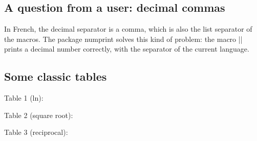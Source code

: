 \subsection{A question from a user: decimal commas}

In French, the decimal separator is a comma, which is also the list separator of the macros. The package numprint solves this kind of problem: the macro |\np| prints a decimal number correctly, with the separator of the current language.
\begin{tkzexample}
\usepackage[french]{babel}
\usepackage[np]{numprint}
\end{tkzexample}

\begin{tkzexample}[vbox]
\end{tkzexample}

\subsection{Some classic tables}

Table 1 (ln):

\begin{tkzexample}
\end{tkzexample}


\bigskip

Table 2 (square root):

\begin{tkzexample}
\end{tkzexample}

\bigskip

Table 3 (reciprocal):

\begin{tkzexample}
\end{tkzexample}

